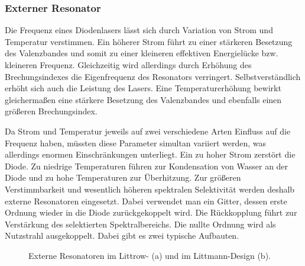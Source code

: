 \subsubsection{Externer Resonator}\label{subsubsec:externer_resonator}
Die Frequenz eines Diodenlasers lässt sich durch Variation von Strom und
Temperatur verstimmen.
Ein höherer Strom führt zu einer stärkeren Besetzung des Valenzbandes und somit zu
einer kleineren effektiven Energielücke bzw. kleineren Frequenz. Gleichzeitig
wird allerdings durch Erhöhung des Brechungsindexes die Eigenfrequenz des
Resonators verringert. Selbstverständlich erhöht sich auch die Leistung des
Lasers. Eine Temperaturerhöhung bewirkt gleichermaßen eine stärkere Besetzung
des Valenzbandes und ebenfalls einen größeren Brechungsindex.\par
Da Strom und Temperatur jeweils auf zwei verschiedene Arten Einfluss auf die
Frequenz haben, müssten diese Parameter simultan variiert werden, was
allerdings enormen Einschränkungen unterliegt. Ein zu hoher Strom zerstört die
Diode. Zu niedrige Temperaturen führen zur Kondensation von Wasser an der Diode
und zu hohe Temperaturen zur Überhitzung. Zur größeren Verstimmbarkeit und wesentlich
höheren spektralen Selektivität werden deshalb externe Resonatoren eingesetzt.
Dabei verwendet man ein Gitter, dessen erste Ordnung wieder in die Diode
zurückgekoppelt wird. Die Rückkopplung führt zur Verstärkung des selektierten
Spektralbereichs. Die nullte Ordnung wird als Nutzstrahl ausgekoppelt. Dabei
gibt es zwei typische Aufbauten.\par
\begin{figure}[h]
 	\centering
	\caption[Externe Resonatoren - Aufbau]{Externe
	Resonatoren im Littrow- (a) und im Littmann-Design
	(b).}
	\label{fig:externe_resonatoren_aufbau}
\end{figure}
